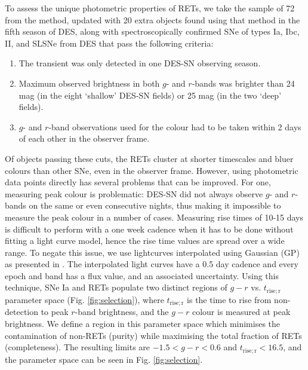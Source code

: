 \documentclass[fleqn,usenatbib,]{mnras}
\newcommand{\replychris}[1]{\color{magenta}#1 \color{black}}
\newcommand{\replylluis}[1]{\color{green}#1 \color{black}}
\begin{document}
To assess the unique photometric properties of RETs, we take the sample of 72 from the  method, updated with 20 extra objects found using that method in the fifth season of DES, along with spectroscopically confirmed SNe of types Ia, Ibc, II, and SLSNe from DES that pass the following criteria:
\begin{enumerate}
\item The transient was only detected in one DES-SN observing season.
\item Maximum observed brightness in both $g$- and $r$-bands was brighter than 24 mag (in the eight `shallow' DES-SN fields) or 25 mag (in the two `deep' fields).
\item $g$- and $r$-band observations used for the colour had to be taken within 2 days of each other in the observer frame.
\end{enumerate}

Of objects passing these cuts, the RETs cluster at shorter timescales and bluer colours than other SNe, even in the observer frame. However, using photometric data points directly has several problems that can be improved. For one, measuring peak colour is problematic: DES-SN did not always observe $g$- and $r$-bands on the same or even consecutive nights, thus making it impossible to measure the peak colour in a number of cases. Measuring rise times of 10-15 days is difficult to perform with a one week cadence when it has to be done without fitting a light curve model, hence the rise time values are spread over a wide range. To negate this issue, we use lightcurves interpolated using Gaussian  (GP) as presented in \citet{Pursiainen2019}. The interpolated light curves have a 0.5 day cadence and every epoch \replychris{and band} has a flux value, and an associated uncertainty. Using this technique, SNe Ia and RETs populate two distinct regions of $g-r$ \replylluis{vs.} $t_{\mathrm{rise; r}}$ parameter space (Fig. \ref{fig:selection}), \replychris{where $t_{\mathrm{rise; r}}$ is the time to rise from non-detection to peak $r$-band brightness, and the $g-r$ colour is measured at peak brightness.} We define a region in this parameter space which minimises the contamination of non-RETs (purity) while maximising the total fraction of RETs (completeness). The resulting limits are $-1.5 < g-r < 0.6 $ and $t_{\mathrm{rise; r}} <16.5$, and the parameter space can be seen in Fig. \ref{fig:selection}.
\end{document}
